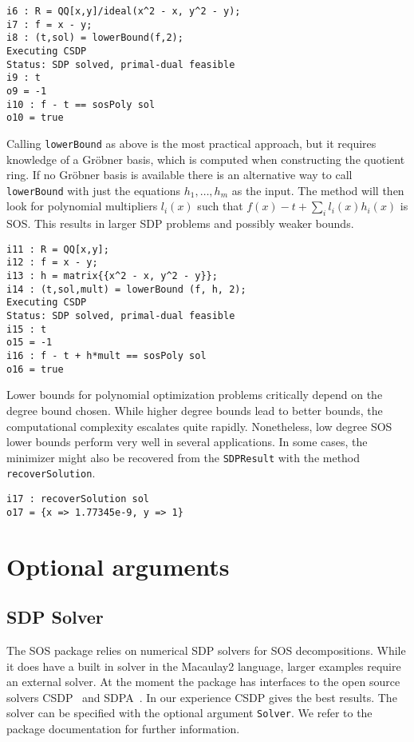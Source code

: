 \documentclass[11pt]{amsart}
\theoremstyle{plain}%
\theoremstyle{definition}
\theoremstyle{remark}
\newcommand{\Mac}{Macaulay2\xspace}
\newcommand{\SOS}{\textsc{SOS}\xspace}
\begin{document}
{\small
\begin{verbatim}
i6 : R = QQ[x,y]/ideal(x^2 - x, y^2 - y);
i7 : f = x - y;
i8 : (t,sol) = lowerBound(f,2);
Executing CSDP
Status: SDP solved, primal-dual feasible
i9 : t
o9 = -1
i10 : f - t == sosPoly sol
o10 = true
\end{verbatim}
}

Calling \verb|lowerBound| as above is the most practical approach, but it requires knowledge of a Gröbner basis, which is computed when constructing the quotient ring.
If no Gröbner basis is available there is an alternative way to call \verb|lowerBound| with just the equations $h_1,\dots,h_m$ as the input.
The method will then look for polynomial multipliers $l_i(x)$ such that $f(x) - t + \sum_i l_i(x)h_i(x)$ is SOS.
This results in larger SDP problems and possibly weaker bounds.

{\small
\begin{verbatim}
i11 : R = QQ[x,y];
i12 : f = x - y;
i13 : h = matrix{{x^2 - x, y^2 - y}};
i14 : (t,sol,mult) = lowerBound (f, h, 2);
Executing CSDP
Status: SDP solved, primal-dual feasible
i15 : t
o15 = -1
i16 : f - t + h*mult == sosPoly sol
o16 = true
\end{verbatim}
}

Lower bounds for polynomial optimization problems critically depend on the degree bound chosen.
While higher degree bounds lead to better bounds, the computational complexity escalates quite rapidly.
Nonetheless, low degree SOS lower bounds perform very well in several applications.
In some cases, the minimizer might also be recovered from the \verb|SDPResult| with the method \verb|recoverSolution|.

{\small
\begin{verbatim}
i17 : recoverSolution sol
o17 = {x => 1.77345e-9, y => 1}
\end{verbatim}
}

\section{Optional arguments}
\label{s:arguments}

\subsection*{SDP Solver}
The \SOS package relies on numerical SDP solvers for SOS decompositions.  
While it does have a built in solver in the \Mac language, larger examples require an external solver.
At the moment the package has interfaces to the open source solvers CSDP~\cite{borchers1999csdp} and SDPA~\cite{yamashita2003implementation}.
In our experience CSDP gives the best results.
The solver can be specified with the optional argument \verb|Solver|.
We refer to the package documentation for further information.
\end{document}
